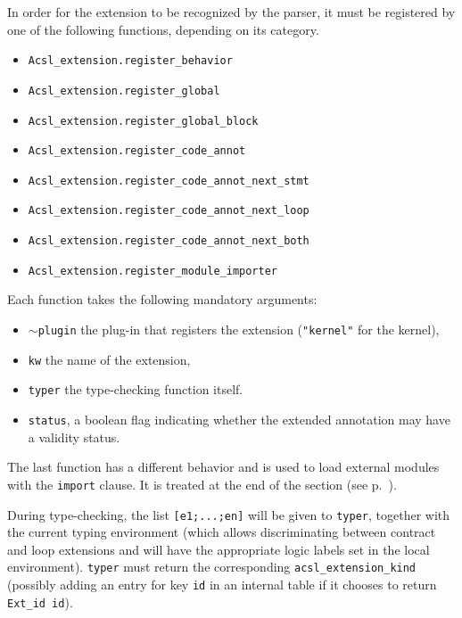 In order for the extension to be recognized by the parser, it must be
registered by one of the following functions, depending on its category.
\begin{itemize}
\item \texttt{Acsl\_extension.register\_behavior}%
\item \texttt{Acsl\_extension.register\_global}%
\item \texttt{Acsl\_extension.register\_global\_block}%
\item \texttt{Acsl\_extension.register\_code\_annot}%
\item \texttt{Acsl\_extension.register\_code\_annot\_next\_stmt}%
\item \texttt{Acsl\_extension.register\_code\_annot\_next\_loop}%
\item \texttt{Acsl\_extension.register\_code\_annot\_next\_both}%
\item \texttt{Acsl\_extension.register\_module\_importer}%
\end{itemize}

Each function takes the following mandatory arguments:
\begin{itemize}
\item \texttt{$\sim$plugin} the plug-in that registers the extension
      (\texttt{"kernel"} for the kernel),
\item \texttt{kw} the name of the extension,
\item \texttt{typer} the type-checking function itself.
\item \texttt{status}, a boolean flag indicating whether the extended
  annotation may have a validity status.
\end{itemize}

The last function has a different behavior and is used to load external
\acsl modules with the \verb+import+ clause. It is treated at the end
of the section (see p.~\pageref{par:ext-modules}).

During type-checking, the list \verb|[e1;...;en]| will be given to \verb|typer|,
together with the current typing environment (which allows discriminating
between contract and loop extensions and will have the appropriate logic labels
set in the local environment). \verb|typer| must return the corresponding
\verb|acsl_extension_kind| (possibly adding an entry for key \verb|id|
in an internal table if it chooses to return \verb|Ext_id id|).

